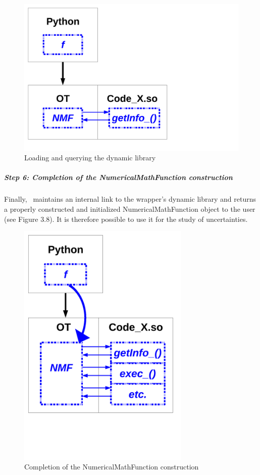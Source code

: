 \begin{figure}
\begin{center}
\includegraphics[width=12cm]{Figures/wrapper/Figure7.pdf}
\caption[Figure 7]{Loading and querying the dynamic library}
\end{center}
\end{figure}

\subparagraph{Step 6: Completion of the NumericalMathFunction construction}

Finally, \OT\ maintains an internal link to the wrapper's dynamic library and returns a properly constructed and initialized NumericalMathFunction object to the user (see Figure 3.8). It is therefore possible to use it for the study of uncertainties.

\begin{figure}
\begin{center}
\includegraphics[height=12cm]{Figures/wrapper/Figure8.pdf}
\caption[Figure 8]{Completion of the NumericalMathFunction construction}
\end{center}
\end{figure}

